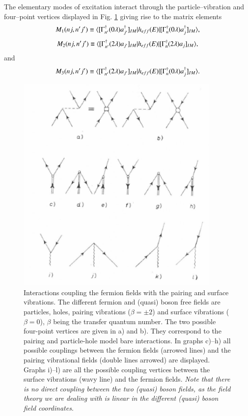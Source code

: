 The elementary modes of excitation interact through the particle--vibration and four--point vertices displayed in Fig. \ref{figC1A6} giving rise to the matrix elements 
  \begin{align}\label{eqC1A83} 
   M_1(nj,n'j')\equiv \langle {[\Gamma^\dagger_{n'}(0\lambda)a^\dagger_{j'}]_{IM}|h_{eff}(E)|[\Gamma^\dagger_n(0\lambda)a^\dagger_j]_{IM}} \rangle,
    \end{align}   
  \begin{align}\label{eqC1A84} 
   M_2(nj,n'j')\equiv \langle {[\Gamma^\dagger_{n'}(2\lambda)a_{j'}]_{IM}|h_{eff}(E)|[\Gamma^\dagger_n(2\lambda)a_j]_{IM}} \rangle,
    \end{align}    
and 
  \begin{align}\label{eqC1A85} 
   M_3(nj,n'j')\equiv \langle {[\Gamma^\dagger_{n'}(2\lambda)a_{j'}]_{IM}|h_{eff}(E)|[\Gamma^\dagger_{n}(0\lambda)a^\dagger_j]_{IM}} \rangle.
    \end{align}   
     \begin{figure}
     \centerline {
     \includegraphics*[width=10cm]{introduccion/figs/fig23}
     }
     \caption{Interactions coupling the fermion fields with the pairing and surface vibrations. The different fermion and (quasi) boson free fields are particles, holes, pairing vibrations ($\beta=\pm2$) and surface vibrations ($\beta=0$), $\beta$ being the transfer quantum number. The two possible four-point vertices are given in a) and b). They correspond to the pairing and particle-hole model bare interactions. In graphs c)--h) all possible couplings between the fermion fields (arrowed lines) and the pairing vibrational fields (double lines arrowed) are displayed. Graphs i)--l) are all the possible coupling vertices between the surface vibrations (wavy line) and the fermion fields. \textit{Note that there is no direct coupling between the two (quasi) boson fields, as the field theory we are dealing with is linear in the different (quasi) boson field coordinates}.}
     \label{figC1A6}
     \end{figure}

